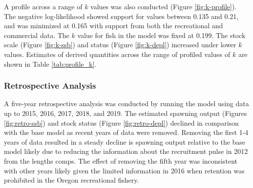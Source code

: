 \documentclass[11pt,
  english,
  a4paper,
]{article}
\begin{document}
\leavevmode\tagmcend\tagstructend\par


A profile across a range of {\(k\)\leavevmode\tagmcend\tagstructend} values was also conducted (Figure \ref{fig:k-profile}). The negative log-likelihood showed support for values between 0.135 and 0.21, and was minimized at 0.165 with support from both the recreational and commercial data. The {\(k\)\leavevmode\tagmcend\tagstructend} value for fish in the model was fixed at 0.199. The stock scale (Figure \ref{fig:k-ssb}) and status (Figure \ref{fig:k-depl}) increased under lower {\(k\)\leavevmode\tagmcend\tagstructend} values. Estimates of derived quantities across the range of profiled values of {\(k\)\leavevmode\tagmcend\tagstructend} are shown in Table \ref{tab:profile_k}.

\leavevmode\tagmcend\tagstructend\par


\hypertarget{retrospective-analysis}{%
\subsubsection{Retrospective Analysis}\label{retrospective-analysis}}

\leavevmode\tagmcend\tagstructend


A five-year retrospective analysis was conducted by running the model using data up to 2015, 2016, 2017, 2018, and 2019. The estimated spawning output (Figures \ref{fig:retro-ssb}) and stock status (Figure \ref{fig:retro-depl}) declined in comparison with the base model as recent years of data were removed. Removing the first 1-4 years of data resulted in a steady decline is spawning output relative to the base model likely due to reducing the information about the recruitment pulse in 2012 from the lengths comps. The effect of removing the fifth year was inconsistent with other years likely given the limited information in 2016 when retention was prohibited in the Oregon recreational fishery.

\leavevmode\tagmcend\tagstructend\par
\end{document}
